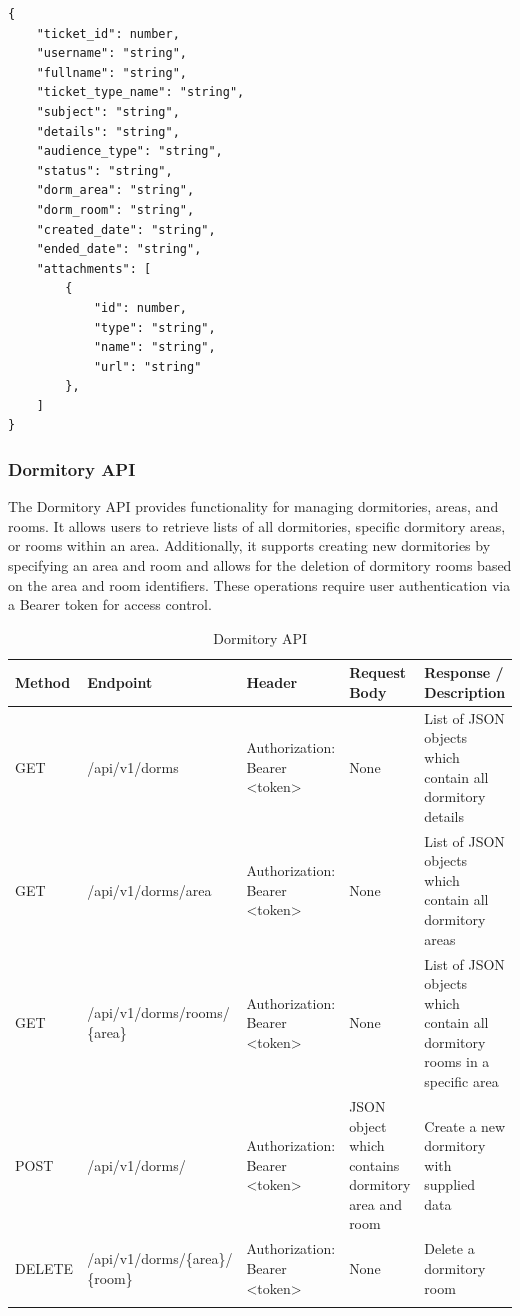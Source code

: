 \begin{lstlisting}[breaklines=true, caption=Ticket Schema]
{
	"ticket_id": number,
	"username": "string",
	"fullname": "string",
	"ticket_type_name": "string",
	"subject": "string",
	"details": "string",
	"audience_type": "string",
	"status": "string",
	"dorm_area": "string",
	"dorm_room": "string",
	"created_date": "string",
	"ended_date": "string",
	"attachments": [
		{
			"id": number,
			"type": "string",
			"name": "string",
			"url": "string"
		},
	]
}
\end{lstlisting}



\subsubsection{Dormitory API}
The Dormitory API provides functionality for managing dormitories, areas, and rooms. It allows users to retrieve lists of all dormitories, specific dormitory areas, or rooms within an area. Additionally, it supports creating new dormitories by specifying an area and room and allows for the deletion of dormitory rooms based on the area and room identifiers. These operations require user authentication via a Bearer token for access control.
\begin{longtable}{|m{1.6cm}|m{5cm}|m{3cm}|m{3cm}|m{3.2cm}|}
	\hline
	\textbf{Method} & \textbf{Endpoint} & \textbf{Header}                                                                                                                            & \textbf{Request Body} & \textbf{Response / Description}   \\ \hline
	\endhead
	
	GET & /api/v1/dorms & Authorization: Bearer <token> & None & List of JSON objects which contain all dormitory details \\ \hline
	
	GET & /api/v1/dorms/area & Authorization: Bearer <token> & None  & List of JSON objects which contain all dormitory areas\\ \hline
	
	GET & /api/v1/dorms/rooms/ \newline \{area\} & Authorization: Bearer <token> & None  & List of JSON objects which contain all dormitory rooms in a specific area\\ \hline
	
	POST & /api/v1/dorms/ & Authorization: Bearer <token> & JSON object which contains dormitory area and room  & Create a new dormitory with supplied data \\ \hline
	
	DELETE & /api/v1/dorms/\{area\}/ \newline \{room\}  & Authorization: Bearer <token> & None  & Delete a dormitory room \\ \hline

	
	\caption{Dormitory API}
	\label{tab:dorm-api}
	
\end{longtable}


